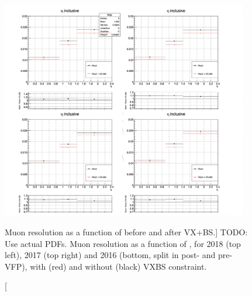 \begin{figure}[!htbp]
\begin{center}
	\includegraphics[width=0.96\textwidth]{figures/higgsmassmeas/vxbs/vxbs_muon_pTresol_vs_eta.png}
    \caption
    [Muon \pT resolution as a function of \pT before and after VX+BS.]
    {TODO: Use actual PDFs. Muon \pT resolution as a function of \abseta, for 2018 (top left), 2017 (top right) 
and 2016 (bottom, split in post- and pre-VFP), with (red) and without (black) VXBS constraint.}
\label{fig:Resolution_eta}
\end{center}
\end{figure}

